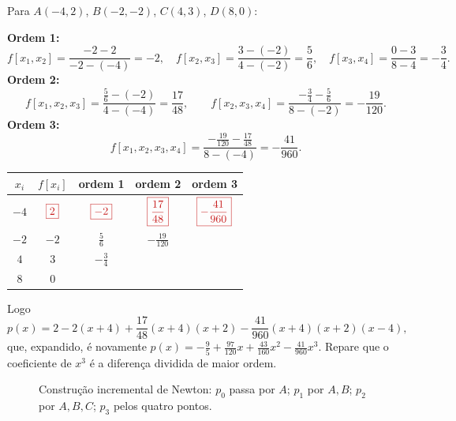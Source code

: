\begin{exemplo}
Para $A(-4,2)$, $B(-2,-2)$, $C(4,3)$, $D(8,0)$:

\textbf{Ordem 1:}
\[
f[x_1,x_2]=\frac{-2-2}{-2-(-4)}=-2,\quad
f[x_2,x_3]=\frac{3-(-2)}{4-(-2)}=\frac56,\quad
f[x_3,x_4]=\frac{0-3}{8-4}=-\frac34.
\]
\textbf{Ordem 2:}
\[
f[x_1,x_2,x_3]=\frac{\frac56-(-2)}{4-(-4)}=\frac{17}{48},\qquad
f[x_2,x_3,x_4]=\frac{-\frac34-\frac56}{8-(-2)}=-\frac{19}{120}.
\]
\textbf{Ordem 3:}
\[
f[x_1,x_2,x_3,x_4]=\frac{-\frac{19}{120}-\frac{17}{48}}{8-(-4)}=-\frac{41}{960}.
\]
\begin{center}
\renewcommand{\arraystretch}{1.6}
\begin{tabular}{c|c|c|c|c}
$x_i$ & $f[x_i]$ & ordem 1 & ordem 2 & ordem 3\\ \hline
$-4$ & $\color{vermelho}\boxed{2}$ & $\color{vermelho}\boxed{-2}$ & $\color{vermelho}\boxed{\frac{17}{48}}$ & $\color{vermelho}\boxed{-\frac{41}{960}}$\\
$-2$ & $-2$ & $\frac56$ & $-\frac{19}{120}$ & \\
$4$ & $3$ & $-\frac34$ & & \\
$8$ & $0$ & & &
\end{tabular}
\end{center}
Logo
\[
p(x)=2-2(x+4)+\frac{17}{48}(x+4)(x+2)-\frac{41}{960}(x+4)(x+2)(x-4),
\]
que, expandido, é novamente $p(x)=-\frac95+\frac{97}{120}x+\frac{43}{160}x^2-\frac{41}{960}x^3$.
Repare que o coeficiente de $x^3$ é a diferença dividida de maior ordem.
\end{exemplo}

\begin{figure}[h]
\centering
{}
\caption{Construção incremental de Newton: $p_0$ passa por $A$; $p_1$ por $A,B$;
$p_2$ por $A,B,C$; $p_3$ pelos quatro pontos.}
\end{figure}

